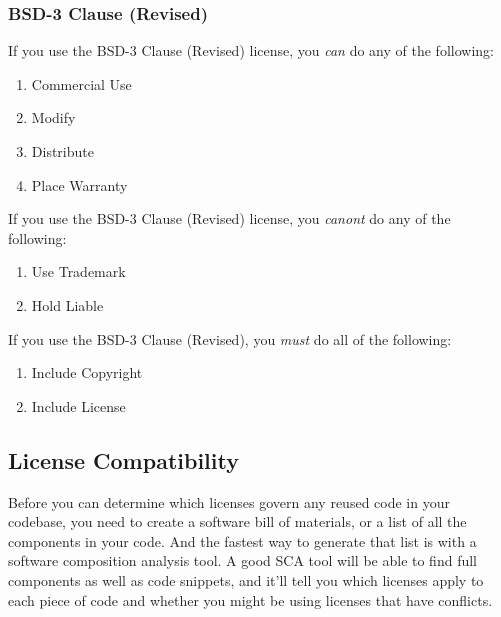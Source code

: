 
\subsubsection{BSD-3 Clause (Revised)}

\begin{flushleft}
	If you use the BSD-3 Clause (Revised) license, you \emph{can} do any of the following:
\end{flushleft}

\begin{enumerate}
	\item Commercial Use
	\item Modify
	\item Distribute
	\item Place Warranty
\end{enumerate}

\begin{flushleft}
	If you use the BSD-3 Clause (Revised) license, you \emph{canont} do any of the following:
\end{flushleft}

\begin{enumerate}
	\item Use Trademark
	\item Hold Liable
\end{enumerate}

\begin{flushleft}
	If you use the BSD-3 Clause (Revised), you \emph{must} do all of the following:
\end{flushleft}

\begin{enumerate}
	\item Include Copyright
	\item Include License
\end{enumerate}

\subsection{License Compatibility}

\begin{flushleft}
	Before you can determine which licenses govern any reused code in your codebase,
	you need to create a software bill of materials, or a list of all the components
	in your code. And the fastest way to generate that list is with a software composition
	analysis tool. A good SCA tool will be able to find full components as well as
	code snippets, and it'll tell you which licenses apply to each piece of code and
	whether you might be using licenses that have conflicts.
\end{flushleft}

